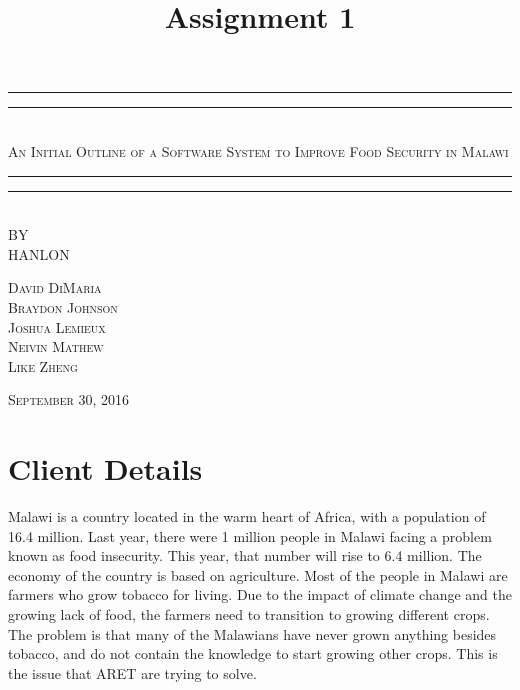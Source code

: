 \documentclass[12pt,letterpaper]{article}
\title{Assignment 1}
\begin{document}
\begin{titlepage}
    \centering
    \vspace*{\baselineskip}
    \rule{\textwidth}{1.6pt}\vspace*{-\baselineskip}\vspace*{2pt}
    \rule{\textwidth}{0.4pt}\\[1.5\baselineskip]
    {\LARGE \textsc{An Initial Outline of a Software System to Improve Food Security in Malawi}}\\[\baselineskip]
	\rule{\textwidth}{0.4pt}\vspace*{-\baselineskip}\vspace{4pt}    
    \rule{\textwidth}{2pt}\\[2\baselineskip]
   
    \vspace*{5\baselineskip}
    \textsc{BY}\\[0.25\baselineskip]
    {\LARGE HANLON} \\
    
    \vspace*{\baselineskip}
    {\textsc{David DiMaria \\ Braydon Johnson \\ Joshua Lemieux \\ Neivin Mathew \\ Like Zheng} \par}
    \vfill
    {\scshape September 30, 2016} \\
  \end{titlepage}
  
  
\tableofcontents
\lhead{} %
\clearpage
{} %
    
\section{Client Details}
Malawi is a country located in the warm heart of Africa, with a population of 16.4 million. Last year, there were 1 million people in Malawi facing a problem known as food insecurity. This year, that number will rise to 6.4 million. The economy of the country is based on agriculture. Most of the people in Malawi are farmers who grow tobacco for living. Due to the impact of climate change and the growing lack of food, the farmers need to transition to growing different crops. The problem is that many of the Malawians have never grown anything besides tobacco, and do not contain the knowledge to start growing other crops. This is the issue that ARET are trying to solve. \par
\end{document}
